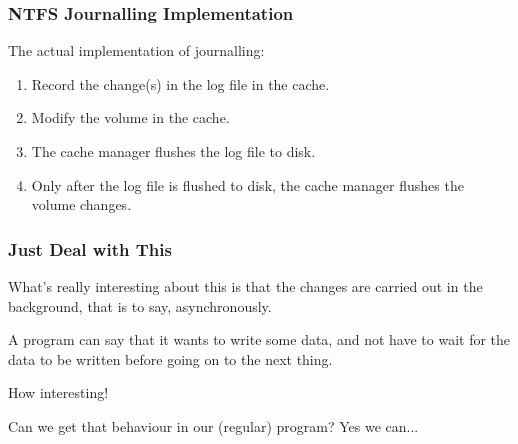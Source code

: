 \begin{frame}
	\frametitle{NTFS Journalling Implementation}

	The actual implementation of journalling:

	\begin{enumerate}
		\item Record the change(s) in the log file in the cache.
		\item Modify the volume in the cache.
		\item The cache manager flushes the log file to disk.
		\item Only after the log file is flushed to disk, the cache manager flushes the volume changes.
	\end{enumerate}

\end{frame}


\begin{frame}
	\frametitle{Just Deal with This}

	What's really interesting about this is that the changes are carried out in the background, that is to say, asynchronously.

	A program can say that it wants to write some data, and not have to wait for the data to be written before going on to the next thing.

	How interesting!

	Can we get that behaviour in our (regular) program? Yes we can...


\end{frame}






